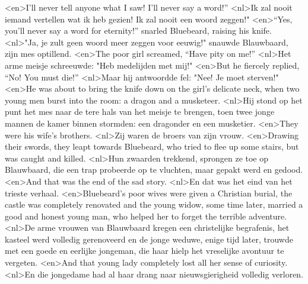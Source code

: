 <en>I’ll never tell anyone what I saw! I’ll never say a word!”
<nl>Ik zal nooit iemand vertellen wat ik heb gezien! Ik zal nooit een woord zeggen!"
<en>“Yes, you’ll never say a word for eternity!” snarled Bluebeard, raising his knife.
<nl>"Ja, je zult geen woord meer zeggen voor eeuwig!" snauwde Blauwbaard, zijn mes optillend.
<en>The poor girl screamed, “Have pity on me!”
<nl>Het arme meisje schreeuwde: "Heb medelijden met mij!"
<en>But he fiercely replied, “No! You must die!”
<nl>Maar hij antwoordde fel: "Nee! Je moet sterven!"
<en>He was about to bring the knife down on the girl’s delicate neck, when two young men burst into the room: a dragon and a musketeer.
<nl>Hij stond op het punt het mes naar de tere hals van het meisje te brengen, toen twee jonge mannen de kamer binnen stormden: een dragonder en een musketier.
<en>They were his wife’s brothers.
<nl>Zij waren de broers van zijn vrouw.
<en>Drawing their swords, they leapt towards Bluebeard, who tried to flee up some stairs, but was caught and killed.
<nl>Hun zwaarden trekkend, sprongen ze toe op Blauwbaard, die een trap probeerde op te vluchten, maar gepakt werd en gedood.
<en>And that was the end of the sad story.
<nl>En dat was het eind van het trieste verhaal.
<en>Bluebeard’s poor wives were given a Christian burial, the castle was completely renovated and the young widow, some time later, married a good and honest young man, who helped her to forget the terrible adventure.
<nl>De arme vrouwen van Blauwbaard kregen een christelijke begrafenis, het kasteel werd volledig gerenoveerd en de jonge weduwe, enige tijd later, trouwde met een goede en eerlijke jongeman, die haar hielp het vreselijke avontuur te vergeten.
<en>And that young lady completely lost all her sense of curiosity.
<nl>En die jongedame had al haar drang naar nieuwsgierigheid volledig verloren.
